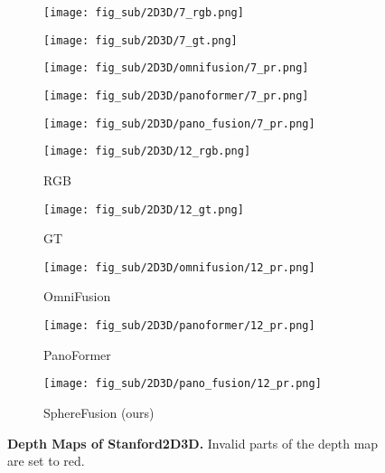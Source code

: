 \begin{figure*}[t]
	\vspace{1pt}
	
	\begin{subfigure}{0.18\linewidth}
		\texttt{[image: fig\_sub/2D3D/7\_rgb.png]}
	\end{subfigure}
	\begin{subfigure}{0.18\linewidth}
		\texttt{[image: fig\_sub/2D3D/7\_gt.png]}
	\end{subfigure}
	\begin{subfigure}{0.18\linewidth}
		\texttt{[image: fig\_sub/2D3D/omnifusion/7\_pr.png]}
	\end{subfigure}
	\begin{subfigure}{0.18\linewidth}
		\texttt{[image: fig\_sub/2D3D/panoformer/7\_pr.png]}
	\end{subfigure}
	\begin{subfigure}{0.18\linewidth}
		\texttt{[image: fig\_sub/2D3D/pano\_fusion/7\_pr.png]}
	\end{subfigure}
	
	\vspace{1pt}
	
	\begin{subfigure}{0.18\linewidth}
		\texttt{[image: fig\_sub/2D3D/12\_rgb.png]}
		\caption{RGB}
	\end{subfigure}
	\begin{subfigure}{0.18\linewidth}
		\texttt{[image: fig\_sub/2D3D/12\_gt.png]}
		\caption{GT}
	\end{subfigure}
	\begin{subfigure}{0.18\linewidth}
		\texttt{[image: fig\_sub/2D3D/omnifusion/12\_pr.png]}
		\caption{OmniFusion \cite{li2022omnifusion}}
	\end{subfigure}
	\begin{subfigure}{0.18\linewidth}
		\texttt{[image: fig\_sub/2D3D/panoformer/12\_pr.png]}
		\caption{PanoFormer \cite{shen2022panoformer}}
	\end{subfigure}
	\begin{subfigure}{0.18\linewidth}
		\texttt{[image: fig\_sub/2D3D/pano\_fusion/12\_pr.png]}
		\caption{SphereFusion (ours)}
	\end{subfigure}
	
	
	\caption{
		\textbf{Depth Maps of Stanford2D3D.} Invalid parts of the depth map are set to red. 
	}
	\label{fig:2d3d_depth}
    \vspace{-1.0em}
\end{figure*}


